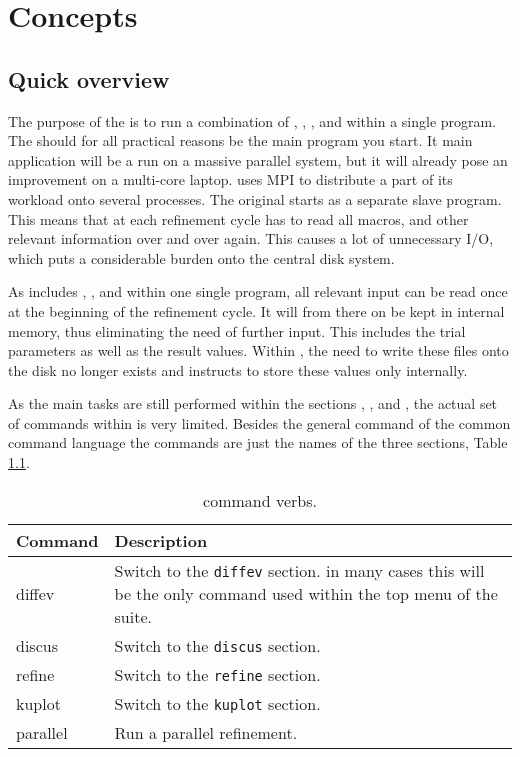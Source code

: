 
\chapter{Concepts \label{concepts}}
\section{Quick overview } 

The purpose of the \Suite is to run a combination of 
\href{./diffev\_man.pdf}\diffev, 
\href{./discus\_man.pdf}\discus,
\href{./refine\_man.pdf}, 
and 
\href{./kuplot\_man.pdf}\Kuplot within a single program. The \Suite 
should for all practical reasons be the main program you start.
It main application  will be a 
run on a massive parallel system, but it will already pose an 
improvement on a multi-core laptop. \Suite uses MPI to distribute 
a part of its workload onto several processes. The original \Diffev
starts \Discus as a separate slave program. This means that at each refinement
cycle \Discus has to read all macros, and other relevant information over and 
over again. This causes a lot of unnecessary I/O, which puts a considerable
burden onto the central disk system.

As \Suite includes \diffev, \discus, \Refine and \Kuplot within one single program,
all relevant input can be read once at the beginning of the refinement cycle.
It will from there on be kept in internal memory, thus eliminating the need of
further input. This includes the trial parameters as well as the result values.
Within \suite, the need to write these files onto the disk no longer exists and 
\Suite instructs \Diffev to store these values only internally.  

As the main tasks are still performed within the sections \diffev, \discus,
 and \kuplot, the actual set of commands within \Suite is very limited. 
Besides the general command of the common command language the commands are
just the names of the three sections, Table \ref{cmd-tab}.

\begin{table}[!b]
\centering
\begin{tabularx}{\textwidth}{|p{30mm}|X|}
  \hline
  {\bf Command } & {\bf Description} \\
  \hline
  diffev & Switch to the {\tt diffev} section. in many cases this
           will be the only command used within the top menu of
           the suite.\\
  \hline
  discus & Switch to the {\tt discus} section.\\
  \hline
  refine & Switch to the {\tt refine} section.\\
  \hline
  kuplot & Switch to the {\tt kuplot} section.\\
  \hline
  parallel & Run a parallel refinement. \\
  \hline
\end{tabularx}
\caption[\Suite command verbs ]
        {\label{cmd-tab}\Suite command verbs.}
\end{table}

